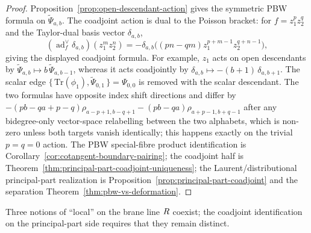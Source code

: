 \documentclass[11pt]{memoir}
\begin{document}
\begin{proof}
  Proposition~\ref{prop:open-descendant-action} gives the symmetric
  PBW formula on $\widetilde\Psi_{a,b}$. The coadjoint action is
  dual to the Poisson bracket: for $f=z_1^pz_2^q$ and the Taylor-dual
  basis vector $\delta_{a,b}$,
  $$(\operatorname{ad}^{\vee}_f\delta_{a,b})(z_1^mz_2^n)
    =-\delta_{a,b}\bigl((pn-qm)z_1^{p+m-1}z_2^{q+n-1}\bigr),$$
  giving the displayed coadjoint formula. For example, $z_1$ acts on
  open descendants by
  $\widetilde\Psi_{a,b}\mapsto b\,\widetilde\Psi_{a,b-1}$, whereas it
  acts coadjointly by $\delta_{a,b}\mapsto-(b+1)\,\delta_{a,b+1}$. The
  scalar edge
  $\{\,\mathrm{Tr}(\phi_1),\widetilde\Psi_{0,1}\,\}=\Psi_{0,0}$ is
  removed with the scalar descendant. The two formulas have opposite
  index shift directions and differ by
  $-(pb-qa+p-q)\rho_{a-p+1,b-q+1}-(pb-qa)\rho_{a+p-1,b+q-1}$
  after any bidegree-only vector-space relabelling between the two
  alphabets, which is non-zero
  unless both targets vanish identically; this happens exactly on the
  trivial $p=q=0$ action. The PBW special-fibre product identification
  is Corollary~\ref{cor:cotangent-boundary-pairing}; the coadjoint
  half is Theorem~\ref{thm:principal-part-coadjoint-uniqueness}; the
  Laurent/distributional principal-part realization is
  Proposition~\ref{prop:principal-part-coadjoint} and the separation
  Theorem~\ref{thm:pbw-vs-deformation}.
\end{proof}

Three notions of ``local'' on the brane line $R$ coexist; the
coadjoint identification on the principal-part side requires that they
remain distinct.
\end{document}
